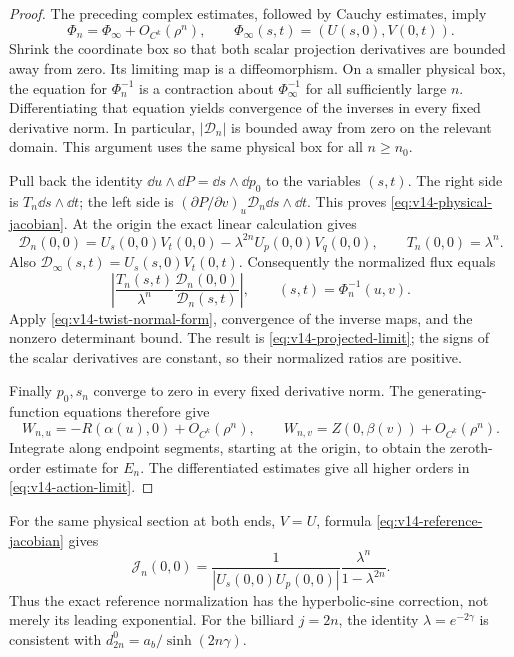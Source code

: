 \begin{proof}
The preceding complex estimates, followed by Cauchy estimates, imply
\[
 \Phi_n=\Phi_\infty+O_{C^k}(\rho^n),\qquad
 \Phi_\infty(s,t)=(U(s,0),V(0,t)).
\]
Shrink the coordinate box so that both scalar projection derivatives
are bounded away from zero. Its limiting map is a diffeomorphism.
On a smaller physical box, the equation for $\Phi_n^{-1}$ is a
contraction about $\Phi_\infty^{-1}$ for all sufficiently large $n$.
Differentiating that equation yields convergence of the inverses in
every fixed derivative norm. In particular, $|\mathcal D_n|$ is bounded
away from zero on the relevant domain. This argument uses the same
physical box for all $n\ge n_0$.

Pull back the identity $\dd u\wedge\dd P=\dd s\wedge\dd p_0$
to the variables $(s,t)$. The right side is
$T_n\dd s\wedge\dd t$; the left side is
$(\partial P/\partial v)_u\mathcal D_n\dd s\wedge\dd t$.
This proves \eqref{eq:v14-physical-jacobian}. At the origin the exact
linear calculation gives
\begin{equation}\label{eq:v14-reference-jacobian}
 \mathcal D_n(0,0)=U_s(0,0)V_t(0,0)
             -\lambda^{2n}U_p(0,0)V_q(0,0),\qquad T_n(0,0)=\lambda^n.
\end{equation}
Also $\mathcal D_\infty(s,t)=U_s(s,0)V_t(0,t)$. Consequently the
normalized flux equals
\[
 \left|\frac{T_n(s,t)}{\lambda^n}
             \frac{\mathcal D_n(0,0)}{\mathcal D_n(s,t)}\right|,
 \qquad (s,t)=\Phi_n^{-1}(u,v).
\]
Apply \eqref{eq:v14-twist-normal-form}, convergence of the inverse maps,
and the nonzero determinant bound. The result is
\eqref{eq:v14-projected-limit}; the signs of the scalar derivatives
are constant, so their normalized ratios are positive.

Finally $p_0,s_n$ converge to zero in every fixed derivative norm.
The generating-function equations therefore give
\[
 W_{n,u}=-R(\alpha(u),0)+O_{C^k}(\rho^n),\qquad
 W_{n,v}= Z(0,\beta(v))+O_{C^k}(\rho^n).
\]
Integrate along endpoint segments, starting at the origin, to obtain
the zeroth-order estimate for $E_n$. The differentiated estimates give
all higher orders in \eqref{eq:v14-action-limit}.
\end{proof}

For the same physical section at both ends, $V=U$, formula
\eqref{eq:v14-reference-jacobian} gives
\[
 \mathcal J_n(0,0)=
 \frac{1}{|U_s(0,0)U_p(0,0)|}
                       \frac{\lambda^n}{1-\lambda^{2n}}.
\]
Thus the exact reference normalization has the hyperbolic-sine
correction, not merely its leading exponential. For the billiard
$j=2n$, the identity $\lambda=e^{-2\gamma}$ is consistent with
$d_{2n}^0=a_b/\sinh(2n\gamma)$.

